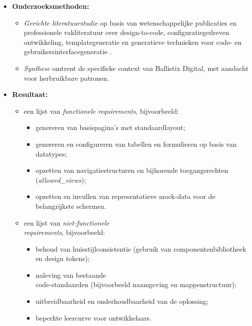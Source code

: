 \begin{itemize}
  \item \textbf{Onderzoeksmethoden:}
        \begin{itemize}
          \item \emph{Gerichte literatuurstudie} op basis van wetenschappelijke publicaties en professionele vakliteratuur over design-to-code, configuratiegedreven ontwikkeling, templategeneratie en generatieve technieken voor code- en gebruikersinterfacegeneratie \parencite{Zan2023NL2Code,Nikiforova2025,Ourai2025,Bistarelli2025LLMCodeReview,Wu2024UICoder}.
          \item \emph{Synthese} omtrent de specifieke context van Ballistix Digital, met aandacht voor herbruikbare patronen.
        \end{itemize}
  \item \textbf{Resultaat:}
        \begin{itemize}
          \item een lijst van \emph{functionele requirements}, bijvoorbeeld:
                \begin{itemize}
                  \item genereren van basispagina's met standaardlayout;
                  \item genereren en configureren van tabellen en formulieren op basis van datatypes;
                  \item opzetten van navigatiestructuren en bijhorende toegangsrechten \\(\emph{allowed\_views});
          \item opzetten en invullen van representatieve mock-data voor de belangrijkste schermen.
                \end{itemize}
          \item een lijst van \emph{niet-functionele \\ requirements}, bijvoorbeeld:
                \begin{itemize}
                  \item behoud van huisstijlconsistentie (gebruik van componentenbibliotheek en design tokens);
                  \item naleving van bestaande \\code-standaarden (bijvoorbeeld naamgeving en mappenstructuur);
                  \item uitbreidbaarheid en onderhoudbaarheid van de oplossing;
                  \item beperkte leercurve voor ontwikkelaars.
                \end{itemize}
        \end{itemize}
\end{itemize}

